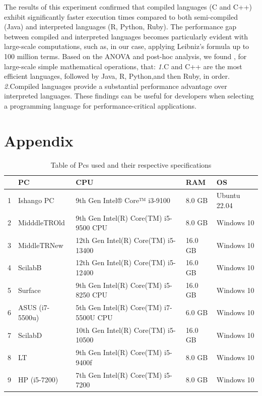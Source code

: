 \documentclass[12pt,halfline,a4paper,]{ouparticle}
\begin{document}
The results of this experiment confirmed that compiled languages (C and
C++) exhibit significantly faster execution times compared to both
semi-compiled (Java) and interpreted languages (R, Python, Ruby). The
performance gap between compiled and interpreted languages becomes
particularly evident with large-scale computations, such as, in our
case, applying Leibniz's formula up to 100 million terms. Based on the
ANOVA and post-hoc analysis, we found , for large-scale simple
mathematical operations, that: \emph{1.}C and C++ are the most efficient
languages, followed by Java, R, Python,and then Ruby, in order.
\emph{2.}Compiled languages provide a substantial performance advantage
over interpreted languages. These findings can be useful for developers
when selecting a programming language for performance-critical
applications.

\newpage

\section{Appendix}\label{appendix}

\begin{table}[ht]
\centering
\begin{tabular}{rllll}
  \hline
 & PC & CPU & RAM & OS \\ 
  \hline
1 & Ishango PC &  9th Gen Intel® Core™ i3-9100  &  8.0 GB  & Ubuntu 22.04 \\ 
  2 & MidddleTROld &  9th Gen Intel(R) Core(TM) i5-9500 CPU  &  8.0 GB  &   Windows 10 \\ 
  3 & MiddleTRNew  &  12th Gen Intel(R) Core(TM) i5-13400  &  16.0 GB  &   Windows 10 \\ 
  4 & ScilabB  &   12th Gen Intel(R) Core(TM) i5-12400  &   16.0 GB   &   Windows 10 \\ 
  5 & Surface  &   9th Gen Intel(R) Core(TM) i5-8250 CPU  &   16.0 GB   &   Windows 10 \\ 
  6 & ASUS (i7-5500u)  &   5th Gen Intel(R) Core(TM) i7-5500U CPU  &   6.0 GB   &   Windows 10 \\ 
  7 & ScilabD  &   10th Gen Intel(R) Core(TM) i5-10500  &   16.0 GB   &   Windows 10 \\ 
  8 & LT  &   9th Gen Intel(R) Core(TM) i5-9400f  &   8.0 GB   &   Windows 10 \\ 
  9 & HP (i5-7200)  &   7th Gen Intel(R) Core(TM) i5-7200  &   8.0 GB   &   Windows 10 \\ 
   \hline
\end{tabular}
\caption{Table of Pcs used and their respective specifications} 
\end{table}
\end{document}
